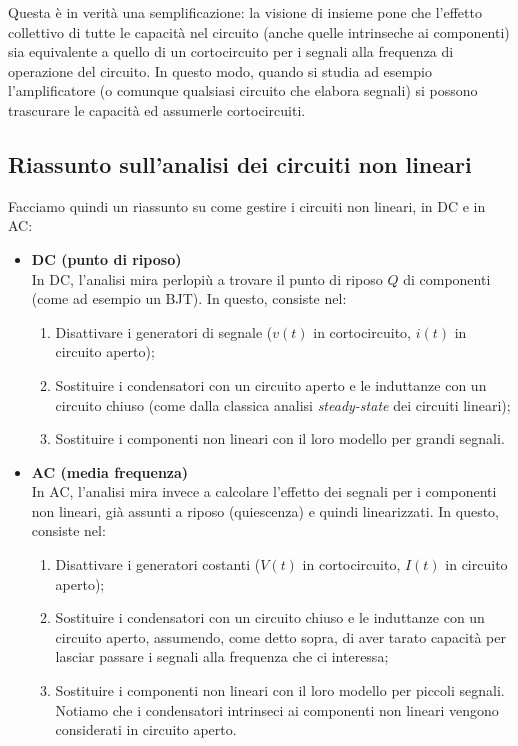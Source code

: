 \documentclass[a4paper,11pt]{article}
\begin{document}
Questa è in verità una semplificazione: la visione di insieme pone che l'effetto collettivo di tutte le capacità nel circuito (anche quelle intrinseche ai componenti) sia equivalente a quello di un cortocircuito per i segnali alla frequenza di operazione del circuito. In questo modo, quando si studia ad esempio l'amplificatore (o comunque qualsiasi circuito che elabora segnali) si possono trascurare le capacità ed assumerle cortocircuiti. 

\subsection{Riassunto sull'analisi dei circuiti non lineari}
Facciamo quindi un riassunto su come gestire i circuiti non lineari, in DC e in AC:
\begin{itemize}
\item \textbf{\textsf{DC (punto di riposo)}} \\
In DC, l'analisi mira perlopiù a trovare il punto di riposo $Q$ di componenti (come ad esempio un BJT). In questo, consiste nel:
\begin{enumerate}
	\item Disattivare i generatori di segnale ($v(t)$ in cortocircuito, $i(t)$ in circuito aperto);
	\item Sostituire i condensatori con un circuito aperto e le induttanze con un circuito chiuso (come dalla classica analisi \textit{steady-state} dei circuiti lineari);
	\item Sostituire i componenti non lineari con il loro modello per grandi segnali.
\end{enumerate}

\item \textbf{\textsf{AC (media frequenza)}} \\
In AC, l'analisi mira invece a calcolare l'effetto dei segnali per i componenti non lineari, già assunti a riposo (quiescenza) e quindi linearizzati. In questo, consiste nel:
\begin{enumerate}
	\item Disattivare i generatori costanti ($V(t)$ in cortocircuito, $I(t)$ in circuito aperto);
	\item Sostituire i condensatori con un circuito chiuso e le induttanze con un circuito aperto, assumendo, come detto sopra, di aver tarato capacità per lasciar passare i segnali alla frequenza che ci interessa;
	\item Sostituire i componenti non lineari con il loro modello per piccoli segnali. Notiamo che i condensatori intrinseci ai componenti non lineari vengono considerati in circuito aperto. 
\end{enumerate}

\end{itemize}
\end{document}
